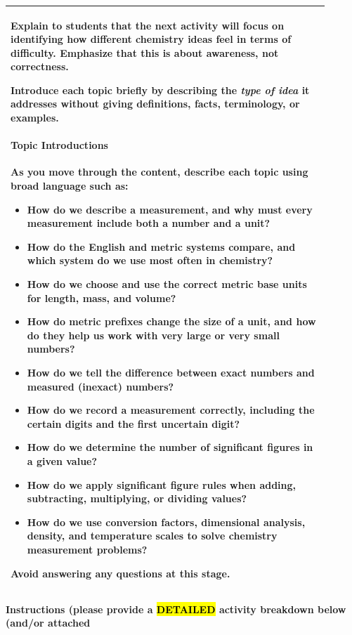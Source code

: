 \documentclass{article}
\begin{document}
\begin{tabular}{|p{0.9\linewidth}|}
\hline
Explain to students that the next activity will focus on identifying how different chemistry ideas feel in terms of difficulty. Emphasize that this is about awareness, not correctness.

Introduce each topic briefly by describing the \emph{type of idea} it addresses without giving definitions, facts, terminology, or examples.

\paragraph{Topic Introductions}
As you move through the content, describe each topic using broad language such as:

\begin{itemize}
    \item How do we describe a measurement, and why must every measurement include both a number and a unit?
    \item How do the English and metric systems compare, and which system do we use most often in chemistry?
    \item How do we choose and use the correct metric base units for length, mass, and volume?
    \item How do metric prefixes change the size of a unit, and how do they help us work with very large or very small numbers?
    \item How do we tell the difference between exact numbers and measured (inexact) numbers?
    \item How do we record a measurement correctly, including the certain digits and the first uncertain digit?
    \item How do we determine the number of significant figures in a given value?
    \item How do we apply significant figure rules when adding, subtracting, multiplying, or dividing values?
    \item How do we use conversion factors, dimensional analysis, density, and temperature scales to solve chemistry measurement problems?
\end{itemize}


Avoid answering any questions at this stage. \\
\hline
\end{tabular}
\newpage

\vspace{0.5cm}
\noindent
{\large \textbf{Instructions (please provide a \hl{DETAILED} activity breakdown below (and/or attached}} \\[0.2em]
\end{document}
